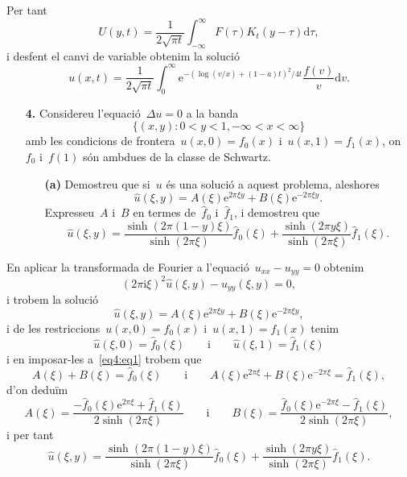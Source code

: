 \documentclass[a4paper]{article}
\theoremstyle{plain}
\theoremstyle{definition}
\newcommand{\iu}{\mathrm{i}}
\newcommand{\e}{\mathrm{e}}
\providecommand{\uppi}{\pi}
\newcommand{\diff}{\mathrm{d}}
\begin{document}
Per tant
\[
    U(y,t)
    =
    \frac{1}{2\sqrt{\uppi t}}
    \int_{-\infty}^{\infty}
    F(\tau)K_{t}
    (y-\tau)
    \diff\tau,
\]
i desfent el canvi de variable obtenim la solució
\[
    u(x,t)
    =
    \frac{1}{2\sqrt{\uppi t}}
    \int_{0}^{\infty}
    \e^{-(\log(v/x)+(1-a)t)^{2}/4t}
    \frac{f(v)}{v}
    \diff v.
\]

\begin{enumerate}
    \item[\textbf{4.}] Considereu l'equació~\(\Delta u=0\) a la banda
        \[
            \{(x,y):0<y<1, -\infty<x<\infty\}
        \]
        amb les condicions de frontera~\(u(x,0)=f_{0}(x)\)
        i~\(u(x,1)=f_{1}(x)\), on~\(f_{0}\) i~\(f(1)\) són ambdues de la classe
        de Schwartz.
        \begin{enumerate}
            \item[\textbf{(a)}] Demostreu que si~\(u\) és una solució a aquest
                problema, aleshores
                \[
                    \widehat{u}(\xi,y) =
                    A(\xi)\e^{2\uppi\xi y}
                    +
                    B(\xi)\e^{-2\uppi\xi y}.
                \]
                Expresseu~\(A\) i~\(B\) en termes de~\(\widehat{f}_{0}\)
                i~\(\widehat{f}_{1}\), i demostreu que
                \[
                    \widehat{u}(\xi,y) =
                    \frac{\sinh(2\uppi(1-y)\xi)}{\sinh(2\uppi\xi)}
                    \widehat{f}_{0}(\xi)
                    +
                    \frac{\sinh(2\uppi y\xi)}{\sinh(2\uppi\xi)}
                    \widehat{f}_{1}(\xi).
                \]
        \end{enumerate}
\end{enumerate}

En aplicar la transformada de Fourier a l'equació~\(u_{xx}-u_{yy}=0\) obtenim
\[
    (2\uppi\iu\xi)^{2}\widehat{u}(\xi,y)
    -
    \widehat{u}_{yy}(\xi,y)
    =
    0,
\]
i trobem la solució
\begin{equation}
    \label{eq4:eq1}
    \widehat{u}(\xi,y)
    =
    A(\xi)
    \e^{2\uppi\xi y}
    +
    B(\xi)
    \e^{-2\uppi\xi y},
\end{equation}
i de les restriccions~\(u(x,0)=f_{0}(x)\) i~\(u(x,1)=f_{1}(x)\) tenim
\[
    \widehat{u}(\xi,0) = \widehat{f}_{0}(\xi)
    \qquad\text{i}\qquad
    \widehat{u}(\xi,1) = \widehat{f}_{1}(\xi)
\]
i en imposar-les a~\eqref{eq4:eq1} trobem que
\[
    A(\xi) + B(\xi) = \widehat{f}_{0}(\xi)
    \qquad\text{i}\qquad
    A(\xi)\e^{2\uppi\xi} + B(\xi)\e^{-2\uppi\xi} = \widehat{f}_{1}(\xi),
\]
d'on deduïm
\[
    A(\xi) =
    \frac{-\widehat{f}_{0}(\xi)\e^{2\uppi\xi}+\widehat{f}_{1}(\xi)}%
    {2\sinh(2\uppi\xi)}
    \qquad\text{i}\qquad
    B(\xi) =
    \frac{\widehat{f}_{0}(\xi)\e^{-2\uppi\xi}-\widehat{f}_{1}(\xi)}%
    {2\sinh(2\uppi\xi)},
\]
i per tant
\[
    \widehat{u}(\xi,y) =
    \frac{\sinh(2\uppi(1-y)\xi)}{\sinh(2\uppi\xi)}
    \widehat{f}_{0}(\xi)
    +
    \frac{\sinh(2\uppi y\xi)}{\sinh(2\uppi\xi)}
    \widehat{f}_{1}(\xi).
\]
\end{document}

